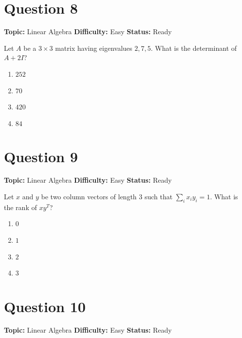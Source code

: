 \documentclass[11pt]{article}
\begin{document}
\newpage

\section*{Question 8}


\noindent\textbf{Topic:} Linear Algebra \quad \textbf{Difficulty:} Easy \quad \textbf{Status:} Ready



Let $A$ be a $3\times 3$ matrix having eigenvalues $2,7,5$. What is the determinant of $A+2I$?
\begin{enumerate}[label=(\Alph*)]
\item $252$
\item $70$
\item $420$
\item $84$
\end{enumerate}

\newpage

\section*{Question 9}


\noindent\textbf{Topic:} Linear Algebra \quad \textbf{Difficulty:} Easy \quad \textbf{Status:} Ready



Let $x$ and $y$ be two column vectors of length $3$ such that $\sum_{i}x_{i}y_{i}=1$. What is the rank of $xy^{T}$?
\begin{enumerate}[label=(\Alph*)]
\item $0$
\item $1$
\item $2$
\item $3$
\end{enumerate}

\newpage

\section*{Question 10}


\noindent\textbf{Topic:} Linear Algebra \quad \textbf{Difficulty:} Easy \quad \textbf{Status:} Ready
\end{document}
